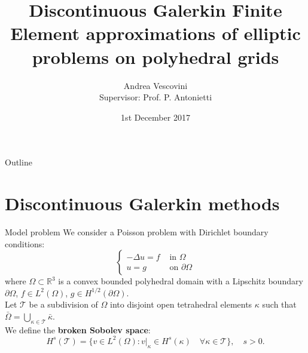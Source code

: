 \documentclass{beamer}
\title
[DG-FE approximations of elliptic problems on polyhedral grids]
{Discontinuous Galerkin Finite Element approximations of elliptic problems on
polyhedral grids}
\author[Andrea Vescovini]{Andrea Vescovini\\ \scriptsize Supervisor: Prof. P. 
Antonietti}
\institute{Politecnico di Milano}
\date{1st December 2017}
\begin{document}
\begin{frame}
	\centering
	\maketitle
\end{frame}
\begin{frame}{Outline}
	\tableofcontents
\end{frame}
\section[DG methods]{Discontinuous Galerkin methods}
\begin{frame}{Model problem}
	We consider a Poisson problem with Dirichlet boundary conditions:
	\begin{equation*}\begin{cases}
		-\Delta u= f& \mbox{ in } \Omega\\
		u = g& \mbox{ on } \partial \Omega
	\end{cases}\end{equation*}
	where $\Omega \subset \mathbb{R}^3$ is a convex bounded polyhedral domain
	with a Lipschitz boundary $\partial \Omega$, $f \in L^2(\Omega)$, $g \in
	H^{1/2}(\partial \Omega)$.\\
	\vspace*{0.5cm}
	Let $\mathcal{T}$ be a subdivision of $\Omega$ into disjoint open
	tetrahedral elements $\kappa$ such that $\bar{\Omega} =
	\bigcup\limits_{\kappa \in \mathcal{T}} \bar{\kappa}$.\\
	\pause
	We define the \textbf{broken Sobolev space}:
	\begin{equation*}
		H^s(\mathcal{T}) = \{ v \in L^2(\Omega) : v|_\kappa \in H^s(\kappa)
		\quad \forall \kappa \in \mathcal{T} \}, \quad s>0.
	\end{equation*}
\end{frame}
\end{document}
